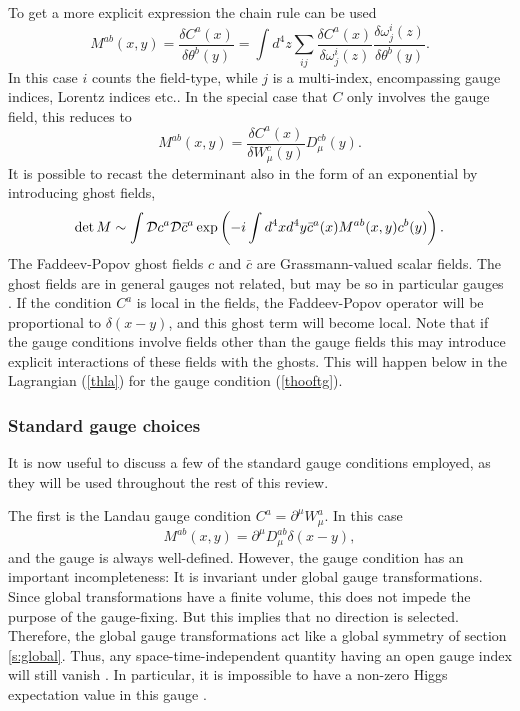 \documentclass[final,twoside,12pt]{article}
\newcommand*{\no}{\noindent}
\newcommand*{\be}{\begin{equation}}
\newcommand*{\ee}{\end{equation}}
\newcommand*{\pd}{\partial}
\newcommand*{\pref}[1]{(\ref{#1})}
\newcommand*{\nn}{\nonumber}
\newcommand*{\1}{1\!\!\!\bot}
\begin{document}
To get a more explicit expression the chain rule can be used
\be
M^{ab}(x,y)=\frac{\delta C^a(x)}{\delta\theta^b(y)}=\int d^4z\sum_{ij}\frac{\delta C^a(x)}{\delta \omega^i_j(z)}\frac{\delta \omega^i_j(z)}{\delta\theta^b(y)}\label{fpsumfield}.
\ee
In this case $i$ counts the field-type, while $j$ is a multi-index, encompassing gauge indices, Lorentz indices etc.. In the special case that $C$ only involves the gauge field, this reduces to
\be
M^{ab}(x,y)=\frac{\delta C^a(x)}{\delta W_\mu^c(y)}D_\mu^{cb}(y).
\ee
\no It is possible to recast the determinant also in the form of an exponential by introducing ghost fields,
\be
\det M\sim\int{\cal D}c^a{\cal D}{\bar c}^a\exp\left(-i\int d^4x d^4y \bar{c}^a(x) M^{ab}(x,y)c^b(y)\right)\nn.
\ee
\no The Faddeev-Popov ghost fields $c$ and $\bar c$ are Grassmann-valued scalar fields. The ghost fields are in general gauges not related, but may be so in particular gauges \cite{Alkofer:2000wg}. If the condition $C^a$ is local in the fields, the Faddeev-Popov operator will be proportional to $\delta(x-y)$, and this ghost term will become local. Note that if the gauge conditions involve fields other than the gauge fields this may introduce explicit interactions of these fields with the ghosts. This will happen below in the Lagrangian \pref{thla} for the gauge condition \pref{thooftg}.

\subsubsection{Standard gauge choices}\label{sss:stdgauge}

It is now useful to discuss a few of the standard gauge conditions employed, as they will be used throughout the rest of this review.

The first is the Landau gauge condition $C^a=\pd^\mu W^a_\mu$. In this case
\be
M^{ab}(x,y)=\pd^\mu D_\mu^{ab}\delta(x-y)\nn,
\ee
\no and the gauge is always well-defined. However, the gauge condition has an important incompleteness: It is invariant under global gauge transformations. Since global transformations have a finite volume, this does not impede the purpose of the gauge-fixing. But this implies that no direction is selected. Therefore, the global gauge transformations act like a global symmetry of section \ref{s:global}. Thus, any space-time-independent quantity having an open gauge index will still vanish \cite{Maas:2012ct}. In particular, it is impossible to have a non-zero Higgs expectation value in this gauge \cite{Maas:2012ct,Frohlich:1980gj,Lee:1974zg}.
\end{document}
